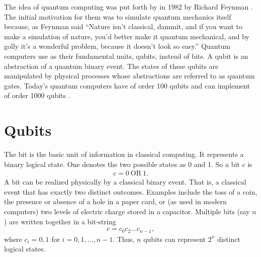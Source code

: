 \documentclass[Dual]{msu-thesis}
\begin{document}
The idea of quantum computing was put forth by in 1982 by Richard Feynman \cite{ref:feynman}. The initial motivation for them was to simulate quantum mechanics itself because, as Feynman said “Nature isn't classical, dammit, and if you want to make a simulation of nature, you'd better make it quantum mechanical, and by golly it's a wonderful problem, because it doesn't look so easy.” Quantum computers use as their fundamental units, qubits, instead of bits. A qubit is an abstraction of a quantum binary event. The states of these qubits are manipulated by physical processes whose abstractions are referred to as quantum gates. Today's quantum computers have of order 100 qubits and can implement of order 1000 qubits \cite{eagle}.

\section{Qubits}

\quad The bit is the basic unit of information in classical computing. It represents a  binary logical state. One denotes the two possible states as 0 and 1. So a bit $c$ is
\begin{align}
c = 0 \ \text{OR} \ 1
.\end{align}
A bit can be realized physically by a classical binary event. That is, a classical event that has exactly two distinct outcomes. Examples include the toss of a coin, the presence or absence of a hole in a paper card, or (as used in modern computers) two levels of electric charge stored in a capacitor. Multiple bits (say $n$) are written together in a bit-string
\begin{align}
c = c_0c_2\ldots c_{n-1}
,\end{align}
where $c_i=0,1$ for $i=0,1,\ldots ,n-1$. Thus, $n$ qubits can represent $2^n$ distinct logical states.
\end{document}
